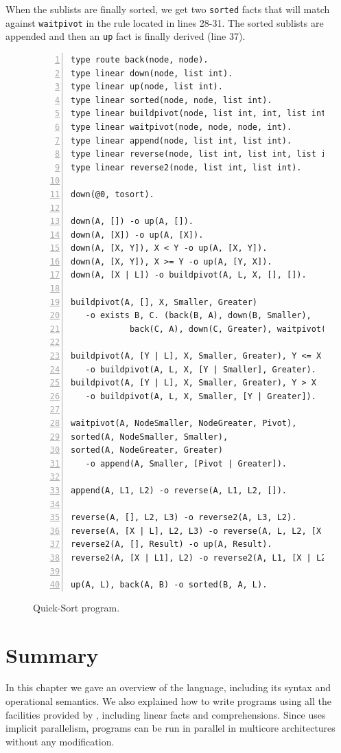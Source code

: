 When the sublists are finally sorted, we get two \texttt{sorted} facts that will match
against \texttt{waitpivot} in the rule located in lines 28-31. The sorted sublists
are appended and then an \texttt{up} fact is finally derived (line 37).

\begin{figure}[h!]
\small\begin{Verbatim}[numbers=left]
type route back(node, node).
type linear down(node, list int).
type linear up(node, list int).
type linear sorted(node, node, list int).
type linear buildpivot(node, list int, int, list int, list int).
type linear waitpivot(node, node, node, int).
type linear append(node, list int, list int).
type linear reverse(node, list int, list int, list int).
type linear reverse2(node, list int, list int).

down(@0, tosort).

down(A, []) -o up(A, []).
down(A, [X]) -o up(A, [X]).
down(A, [X, Y]), X < Y -o up(A, [X, Y]).
down(A, [X, Y]), X >= Y -o up(A, [Y, X]).
down(A, [X | L]) -o buildpivot(A, L, X, [], []).

buildpivot(A, [], X, Smaller, Greater)
   -o exists B, C. (back(B, A), down(B, Smaller),
            back(C, A), down(C, Greater), waitpivot(A, B, C, X)).

buildpivot(A, [Y | L], X, Smaller, Greater), Y <= X
   -o buildpivot(A, L, X, [Y | Smaller], Greater).
buildpivot(A, [Y | L], X, Smaller, Greater), Y > X
   -o buildpivot(A, L, X, Smaller, [Y | Greater]).
   
waitpivot(A, NodeSmaller, NodeGreater, Pivot),
sorted(A, NodeSmaller, Smaller),
sorted(A, NodeGreater, Greater)
   -o append(A, Smaller, [Pivot | Greater]).

append(A, L1, L2) -o reverse(A, L1, L2, []).

reverse(A, [], L2, L3) -o reverse2(A, L3, L2).
reverse(A, [X | L], L2, L3) -o reverse(A, L, L2, [X | L3]).
reverse2(A, [], Result) -o up(A, Result).
reverse2(A, [X | L1], L2) -o reverse2(A, L1, [X | L2]).

up(A, L), back(A, B) -o sorted(B, A, L).
\end{Verbatim}
  \caption{Quick-Sort program.}
  \label{code:quicksort}
\end{figure}
\normalsize


\section{Summary}

In this chapter we gave an overview of the \lang language, including its syntax and operational semantics.
We also explained how to write programs using all the facilities provided by \lang, including
linear facts and comprehensions. Since \lang uses implicit parallelism, programs can be run in parallel
in multicore architectures without any modification.